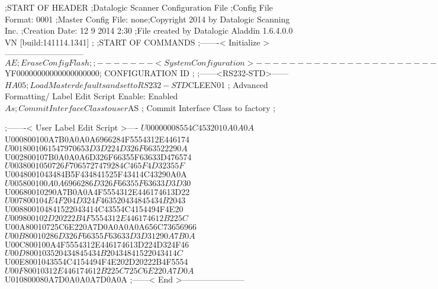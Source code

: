 ;START OF HEADER
;Datalogic Scanner Configuration File
;Config File Format: 0001
;Master Config File: none;Copyright 2014 by Datalogic Scanning Inc.
;Creation Date: 12 9 2014 2:30
;File created by Datalogic Aladdin 1.6.4.0.0 VN [build:141114.1341]
;
;START OF COMMANDS
;-------< Initialize >-----------------------------
$AE                 ; Erase Config Flash
;
;-------< System Configuration >-------------------------------
$YF00000000000000000000; CONFIGURATION ID
;
;------<RS232-STD>------
$HA05               ; Load Master defaults and set to RS232-STD
$CLEEN01            ; Advanced Formatting/ Label Edit Script Enable: Enabled
$As                 ; Commit Interface Class to user
$AS                 ; Commit Interface Class to factory
;

;-------< User Label Edit Script >----
$U00000008554C4532010A0A0A
$U000800100A7B0A0A0A6966284F5554312E446174
$U0018001061547970653D3D224D326F663522290A
$U002800107B0A0A0A6D326F66355F63633D476574
$U0038001050726F7065727479284C465F4D32355F
$U0048001043484B5F434841525F43414C43290A0A
$U005800100A0A6966286D326F66355F63633D3D30
$U00680010290A7B0A0A4F5554312E446174613D22
$U007800104E4F204D324F463520434845434B2043
$U008800104841522043414C43554C4154494F4E20
$U009800102D20222B4F5554312E446174612B225C
$U00A80010725C6E220A7D0A0A0A0A656C73656966
$U00B80010286D326F66355F63633D3D31290A7B0A
$U00C800100A4F5554312E446174613D224D324F46
$U00D800103520434845434B20434841522043414C
$U00E8001043554C4154494F4E202D20222B4F5554
$U00F80010312E446174612B225C725C6E220A7D0A
$U010800080A7D0A0A0A7D0A0A
;------< End >-----------------------
